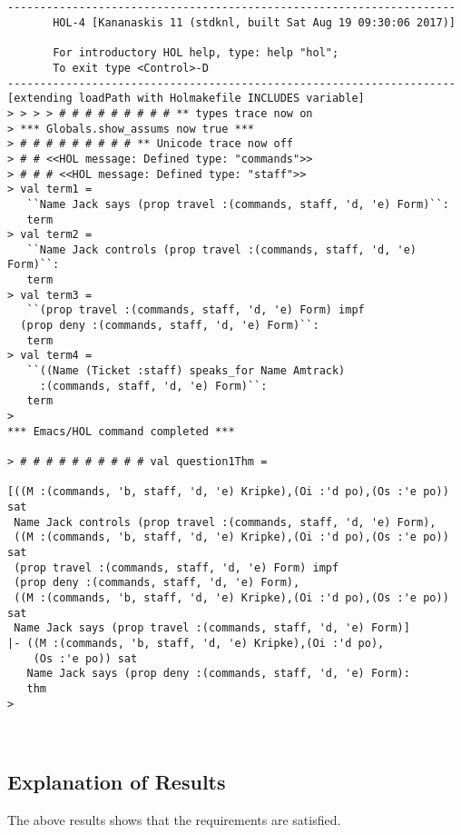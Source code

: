 \documentclass{report}
\begin{document}
\setcounter{sessioncount}{0}
\begin{session}
  \begin{scriptsize}
\begin{verbatim}


---------------------------------------------------------------------
       HOL-4 [Kananaskis 11 (stdknl, built Sat Aug 19 09:30:06 2017)]

       For introductory HOL help, type: help "hol";
       To exit type <Control>-D
---------------------------------------------------------------------
[extending loadPath with Holmakefile INCLUDES variable]
> > > > # # # # # # # # # ** types trace now on
> *** Globals.show_assums now true ***
> # # # # # # # # # ** Unicode trace now off
> # # <<HOL message: Defined type: "commands">>
> # # # <<HOL message: Defined type: "staff">>
> val term1 =
   ``Name Jack says (prop travel :(commands, staff, 'd, 'e) Form)``:
   term
> val term2 =
   ``Name Jack controls (prop travel :(commands, staff, 'd, 'e) Form)``:
   term
> val term3 =
   ``(prop travel :(commands, staff, 'd, 'e) Form) impf
  (prop deny :(commands, staff, 'd, 'e) Form)``:
   term
> val term4 =
   ``((Name (Ticket :staff) speaks_for Name Amtrack)
     :(commands, staff, 'd, 'e) Form)``:
   term
> 
*** Emacs/HOL command completed ***

> # # # # # # # # # # val question1Thm =
   
[((M :(commands, 'b, staff, 'd, 'e) Kripke),(Oi :'d po),(Os :'e po)) sat
 Name Jack controls (prop travel :(commands, staff, 'd, 'e) Form),
 ((M :(commands, 'b, staff, 'd, 'e) Kripke),(Oi :'d po),(Os :'e po)) sat
 (prop travel :(commands, staff, 'd, 'e) Form) impf
 (prop deny :(commands, staff, 'd, 'e) Form),
 ((M :(commands, 'b, staff, 'd, 'e) Kripke),(Oi :'d po),(Os :'e po)) sat
 Name Jack says (prop travel :(commands, staff, 'd, 'e) Form)]
|- ((M :(commands, 'b, staff, 'd, 'e) Kripke),(Oi :'d po),
    (Os :'e po)) sat
   Name Jack says (prop deny :(commands, staff, 'd, 'e) Form):
   thm
> 

 
\end{verbatim}
  \end{scriptsize}
\end{session}

\subsection{Explanation of Results}
\label{sec:explanation-results-1}
The above results shows that the requirements are satisfied.
\end{document}
